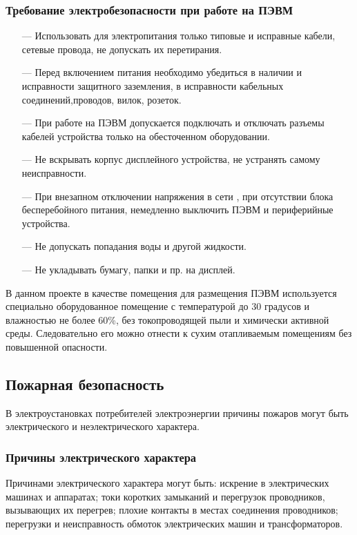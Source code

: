 \subsubsection{Требование электробезопасности при работе на ПЭВМ}
\begin{itemize}
	\item[---]{} Использовать для электропитания только типовые и исправные кабели,
   сетевые провода, не допускать их перетирания.
	\item[---] Перед включением питания необходимо убедиться в наличии и исправности
   защитного заземления, в исправности кабельных соединений,проводов,
   вилок, розеток.
	\item[---] При работе на ПЭВМ допускается подключать и отключать разъемы 
    кабелей устройства только на обесточенном оборудовании.
	\item[---] Не вскрывать корпус дисплейного устройства, не устранять самому
    неисправности.
	\item[---] При внезапном отключении напряжения в сети , при отсутствии блока 
   бесперебойного питания, немедленно выключить ПЭВМ и периферийные
   устройства.
	\item[---] Не допускать попадания воды и другой жидкости.
	\item[---] Не укладывать бумагу, папки и пр. на дисплей.
\end{itemize}


В данном проекте  в качестве помещения для размещения ПЭВМ используется 
специально оборудованное помещение с температурой до 30 градусов и 
влажностью не более 60\%, без токопроводящей пыли и химически
 активной среды. Следовательно его можно отнести к сухим отапливаемым помещениям без
повышенной опасности.


\subsection{Пожарная безопасность}
В электроустановках потребителей электроэнергии причины пожаров могут
быть электрического и неэлектрического характера.


\subsubsection{Причины электрического характера}
Причинами электрического характера могут быть: искрение в электрических
машинах и аппаратах; токи коротких замыканий и перегрузок проводников,
вызывающих их перегрев; плохие контакты в местах соединения проводников;
перегрузки и неисправность обмоток электрических машин и трансформаторов.


